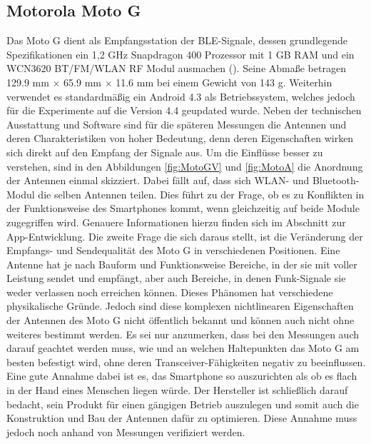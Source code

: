 \subsection{Motorola Moto G}
Das Moto G dient als Empfangsstation der BLE-Signale, dessen grundlegende Spezifikationen ein 1,2 GHz Snapdragon 400 Prozessor mit 1 GB RAM und ein WCN3620 BT/FM/WLAN RF Modul ausmachen (\cite{Moto}). Seine Abmaße betragen 129.9 mm $\times$ 65.9 mm $\times$ 11.6  mm bei einem Gewicht von 143 g. Weiterhin verwendet es standardmäßig ein Android 4.3 als Betriebssystem, welches jedoch für die Experimente auf die Version 4.4 geupdated wurde. Neben der technischen Ausstattung und Software sind für die späteren Messungen die Antennen und deren Charakteristiken von hoher Bedeutung, denn deren Eigenschaften wirken sich direkt auf den Empfang der Signale aus. Um die Einflüsse besser zu verstehen, sind in den Abbildungen \ref{fig:MotoGV} und \ref{fig:MotoA} die Anordnung der Antennen einmal skizziert. Dabei fällt auf, dass sich WLAN- und Bluetooth-Modul die selben Antennen teilen. Dies führt zu der Frage, ob es zu Konflikten in der Funktionsweise des Smartphones kommt, wenn gleichzeitig auf beide Module zugegriffen wird. Genauere Informationen hierzu finden sich im Abschnitt zur App-Entwicklung. Die zweite Frage die sich daraus stellt, ist die Veränderung der Empfangs- und Sendequalität des Moto G in verschiedenen Positionen. Eine Antenne hat je nach Bauform und Funktionsweise Bereiche, in der sie mit voller Leistung sendet und empfängt, aber auch Bereiche, in denen Funk-Signale sie weder verlassen noch erreichen können. Dieses Phänomen hat verschiedene physikalische Gründe. Jedoch sind diese komplexen nichtlinearen Eigenschaften der Antennen des Moto G nicht öffentlich bekannt und können auch nicht ohne weiteres bestimmt werden. Es sei nur anzumerken, dass bei den Messungen auch darauf geachtet werden muss, wie und an welchen Haltepunkten das Moto G am besten befestigt wird, ohne deren Transceiver-Fähigkeiten negativ zu beeinflussen. Eine gute Annahme dabei ist es, das Smartphone so auszurichten als ob es flach in der Hand eines Menschen liegen würde. Der Hersteller ist schließlich darauf bedacht, sein Produkt für einen gängigen Betrieb auszulegen und somit auch die Konstruktion und Bau der Antennen dafür zu optimieren. Diese Annahme muss jedoch noch anhand von Messungen verifiziert werden.
